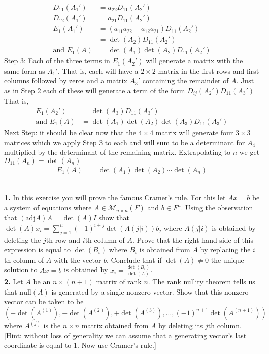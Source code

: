 \documentclass[11pt]{amsart}
\theoremstyle{definition}  %
\begin{document}
\begin{align*}
	D_{11}(A_1') &= a_{22}D_{11}(A_2') \\
	D_{12}(A_1') &= a_{21}D_{11}(A_2') \\
	E_1(A_1') &= (a_{11}a_{22} - a_{12}a_{21})D_{11}(A_2')	\\
	&= \det(A_2)D_{11}(A_2') \\
	\text{and } E_1(A) &= \det(A_1)\det(A_2)D_{11}(A_2')
\end{align*}Step 3: Each of the three terms in $E_1(A_2')$ will generate a matrix with the same form as $A_1'$.  That is, each will have a $2\times 2$ matrix in the first rows and first columns followed by zeros and a matrix $A_3'$ containing the remainder of $A$.  Just as in Step 2 each of these will generate a term of the form $D_{ij}(A_2')D_{11}(A_3')$  That is, 
\begin{align*}
	E_1(A_2') &= \det(A_3)D_{11}(A_3') \\
	\text{and } E_1(A) &= \det(A_1)\det(A_2)\det(A_3)D_{11}(A_3')
\end{align*}Next Step: it should be clear now that the $4\times 4$ matrix will generate four $3 \times 3$ matrices which we apply Step 3 to each and will sum to be a determinant for $A_4$ multiplied by the determinant of the remaining matrix.  Extrapolating to $n$ we get $D_{11}(A_n) = \det(A_n)$
\begin{align*}
	E_1(A) &= \det(A_1)\det(A_2)\cdots \det(A_n)
\end{align*}







\vfill
\eject
{}\\
{\bf 1.} In this exercise you will prove the famous Cramer's rule. For this let $Ax = b$ be a system of equations where $A \in \mathcal{M}_{n \times n}(F)$ and $b \in F^n$.  Using the observation 
that $( \mathrm{adj} A) A = \det(A) I$ show that $ \det (A) x_i = \sum_{j = 1}^n   (-1)^{i+j} \det ( A(j|i)) b_j$ where $A(j|i)$ is obtained by deleting the $j$th row and $i$th column of $A$.
Prove that the right-hand side of this expression is equal to $\det(B_i)$ where $B_i$ is obtained from $A$ by replacing the $i$th column of $A$ with the vector $b$. 
Conclude that if $\det(A) \neq 0$ the unique solution to $Ax = b$ is obtained by $x_i = \frac{\det (B_i)}{\det(A)}$.\\

\vskip 0.1cm
\noindent 
{\bf 2.} Let $A$ be an $n \times (n+1)$ matrix of rank $n$. The rank nullity theorem tells us that $\mathrm{null}(A)$ is generated by a single nonzero vector. Show that 
this nonzero vector can be taken to be 
$$(+ \det(A^{(1)}) , - \det(A^{(2)}), + \det (A^{(3)}), \ldots, (-1)^{n+1} \det (A^{(n+1)}))$$
 where $A^{(j)}$ is the $n \times n$ matrix obtained 
from $A$ by deleting its $j$th column. [Hint: without loss of generality we can assume that a generating vector's last coordinate is equal to $1$. Now use Cramer's rule.]\\
\end{document}
